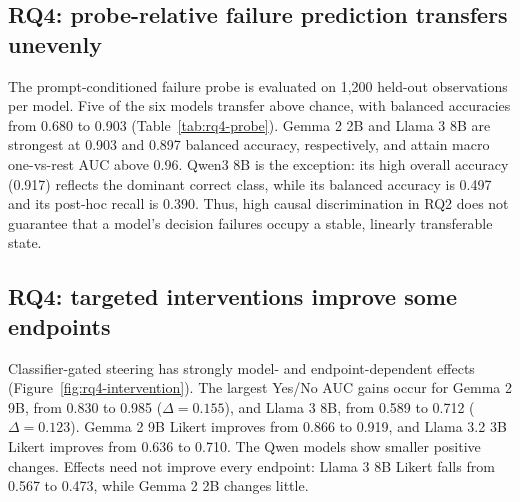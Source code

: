 \subsection{RQ4: probe-relative failure prediction transfers unevenly}
The prompt-conditioned failure probe is evaluated on 1,200 held-out observations per model. Five of the six models transfer above chance, with balanced accuracies from 0.680 to 0.903 (Table~\ref{tab:rq4-probe}). Gemma 2 2B and Llama 3 8B are strongest at 0.903 and 0.897 balanced accuracy, respectively, and attain macro one-vs-rest AUC above 0.96. Qwen3 8B is the exception: its high overall accuracy (0.917) reflects the dominant correct class, while its balanced accuracy is 0.497 and its post-hoc recall is 0.390. Thus, high causal discrimination in RQ2 does not guarantee that a model's decision failures occupy a stable, linearly transferable state.

\begin{table}[t]
\centering
\small
{}
\caption{Frozen three-way probe-relative failure-probe performance on held-out items. Accuracy uses the probe's three-class argmax prediction, without a threshold. AUC is macro one-vs-rest ROC-AUC; the rightmost three columns are class recalls.}
\label{tab:rq4-probe}
\end{table}

\subsection{RQ4: targeted interventions improve some endpoints}
Classifier-gated steering has strongly model- and endpoint-dependent effects (Figure~\ref{fig:rq4-intervention}). The largest Yes/No AUC gains occur for Gemma 2 9B, from 0.830 to 0.985 ($\Delta=0.155$), and Llama 3 8B, from 0.589 to 0.712 ($\Delta=0.123$). Gemma 2 9B Likert improves from 0.866 to 0.919, and Llama 3.2 3B Likert improves from 0.636 to 0.710. The Qwen models show smaller positive changes. Effects need not improve every endpoint: Llama 3 8B Likert falls from 0.567 to 0.473, while Gemma 2 2B changes little.

